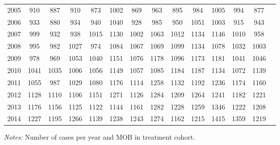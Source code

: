 \begin{table}[H]
\begin{threeparttable}
{\begin{tabular}{l*{13}{c}}
2005        &         910&         887&         910&         873&        1002&         869&         963&         895&         984&        1005&         994&         877\\
2006        &         933&         880&         934&         940&        1040&         928&         985&         950&        1051&        1003&         915&         943\\
2007        &         999&         932&         938&        1015&        1130&        1002&        1063&        1012&        1134&        1146&        1010&         958\\
2008        &         995&         982&        1027&         974&        1084&        1067&        1069&        1099&        1134&        1078&        1032&        1003\\
2009        &         978&         969&        1053&        1040&        1151&        1076&        1178&        1096&        1173&        1181&        1041&        1046\\
2010        &        1041&        1035&        1006&        1056&        1149&        1057&        1085&        1184&        1187&        1134&        1072&        1139\\
2011        &        1055&         987&        1029&        1080&        1176&        1114&        1258&        1132&        1192&        1236&        1174&        1160\\
2012        &        1128&        1110&        1106&        1151&        1271&        1126&        1284&        1209&        1264&        1241&        1182&        1221\\
2013        &        1176&        1156&        1125&        1122&        1144&        1161&        1282&        1228&        1259&        1346&        1222&        1208\\
2014        &        1227&        1195&        1266&        1139&        1238&        1243&        1274&        1162&        1215&        1415&        1359&        1219\\
 \bottomrule \end{tabular} } \begin{tablenotes} \item \scriptsize \emph{Notes:} Number of cases per year and MOB in treatment cohort. \end{tablenotes} \end{threeparttable} \end{table} 
